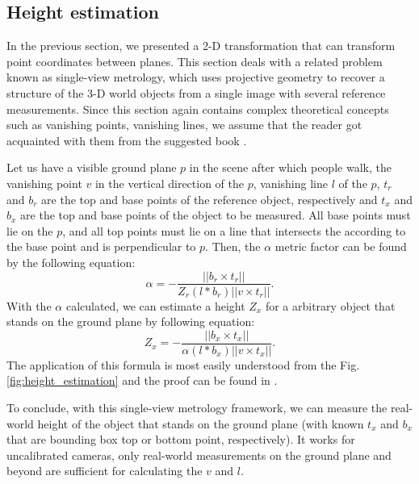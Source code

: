         \subsection{Height estimation}
            In the previous section, we presented a 2-D transformation that can transform point coordinates between planes. This section deals with a related problem known as single-view metrology, which uses projective geometry to recover a structure of the 3-D world objects from a single image with several reference measurements. Since this section again contains complex theoretical concepts such as vanishing points, vanishing lines, we assume that the reader got acquainted with them from the suggested book \cite{hartley2003multiple}.
            
            Let us have a visible ground plane $p$ in the scene after which people walk, the vanishing point $v$ in the vertical direction of the $p$, vanishing line $l$ of the $p$, $t_r$ and $b_r$ are the top and base points of the reference object, respectively and $t_x$ and $b_x$ are the top and base points of the object to be measured. All base points must lie on the $p$, and all top points must lie on a line that intersects the according to the base point and is perpendicular to $p$. Then, the $\alpha$ metric factor can be found by the following equation:
            \begin{equation}\label{height_equation_1}
                \alpha = - \frac{|| b_r \times t_r ||}{Z_r (l * b_r) || v \times  t_r|| }.
            \end{equation}
            With the $\alpha$ calculated, we can estimate a height $Z_x$ for a arbitrary object that stands on the ground plane by following equation:
            \begin{equation}\label{height_equation_2}
                  Z_x = - \frac{|| b_x \times t_x ||}{\alpha (l * b_x) || v \times  t_x|| }.
            \end{equation}
            The application of this formula is most easily understood from the Fig. \ref{fig:height_estimation} and the proof can be found in \cite{criminisi2002single}.
            
            To conclude, with this single-view metrology framework, we can measure the real-world height of the object that stands on the ground plane (with known $t_x$ and $b_x$ that are bounding box top or bottom point, respectively). It works for uncalibrated cameras, only real-world measurements on the ground plane and beyond are sufficient for calculating the $v$ and $l$. 

